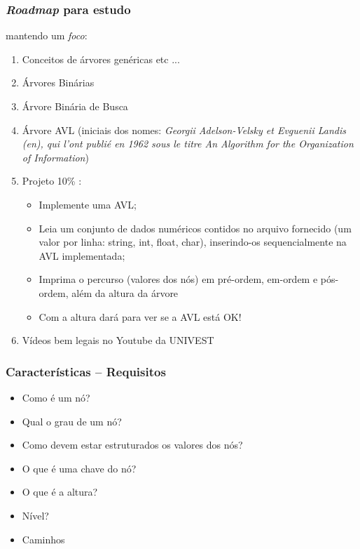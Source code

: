 \begin{frame}
    \frametitle{\textit{Roadmap} para estudo}
    
\begin{block}{mantendo um \textit{foco}:}

\begin{enumerate}
  \item Conceitos de árvores genéricas etc ... 
    \item Árvores Binárias
  \item Árvore Binária de Busca
   \item Árvore AVL (iniciais dos nomes:  \textit{Georgii Adelson-Velsky et Evguenii Landis (en), 
   qui l'ont publié en 1962 sous le titre An Algorithm for the Organization of Information})
   \item Projeto 10\% : 
   \begin{itemize}
     \item  Implemente uma AVL;
    \item   Leia um conjunto de dados numéricos contidos no arquivo fornecido (um valor por linha: string, int, float, char), inserindo-os sequencialmente na AVL implementada;
    \item   Imprima o percurso (valores dos nós) em pré-ordem, em-ordem e pós-ordem, além da altura da árvore
    \item Com a altura dará para ver se a AVL está OK!
   \end{itemize}
  
  \item Vídeos bem legais no Youtube da UNIVEST
  
\end{enumerate}


\end{block}



    \end{frame}

\begin{frame}
    \frametitle{Características -- Requisitos}
    
\begin{itemize}
  
  \item  Como é um nó?
  \item  Qual o grau de um nó?
  \item  Como devem estar estruturados os valores dos nós?
  \item  O que é uma chave do nó?
  \item  O que é a altura?
  \item  Nível?
  \item  Caminhos

\end{itemize}


\end{frame}

